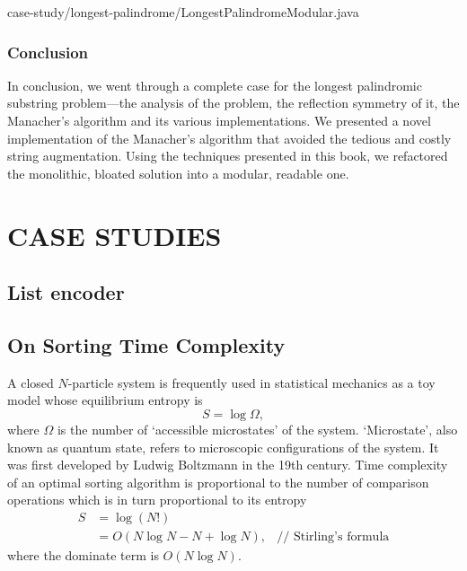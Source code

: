 \documentclass[oneside,11pt]{book}
\theoremstyle{definition}
\theoremstyle{remark}
\begin{document}

{case-study/longest-palindrome/LongestPalindromeModular.java}


\section{Conclusion}\label{sec:conclusion}

In conclusion, we went through a complete case for the longest palindromic substring
problem---the analysis of the problem, the reflection symmetry of it, the Manacher's algorithm
and its various implementations.
We presented a novel implementation of the Manacher's algorithm that avoided the tedious and costly
string augmentation.
Using the techniques presented in this book, we refactored the monolithic, bloated solution
into a modular, readable one.
\clearpage{}

    \part{\uppercase{Case Studies}}\label{prt:caseStudies}

    \clearpage{}

\chapter{List encoder}

\begin{clisting}
    
\end{clisting}

\clearpage{}

    \appendix
    \clearpage{}

\chapter{On Sorting Time Complexity}\label{ch:timeComplexityOfSorting}

A closed $N$-particle system is frequently used in statistical mechanics as a toy model
whose equilibrium entropy is \[S = \log \Omega,\] where $\Omega$ is the
number of `accessible microstates' of the system\cite{kittel1980thermal}.
`Microstate', also known as quantum state, refers to microscopic configurations of the system.
It was first developed by Ludwig Boltzmann in the 19th century.
Time complexity of an optimal sorting algorithm is proportional to the number of comparison
operations which is in turn proportional to its entropy
\begin{align*}
    S &= \log\left( N! \right) & \\
    &= O(N\log N-N + \log N), & \text{// Stirling's formula}
\end{align*}
where the dominate term is $O(N\log N)$.
\clearpage{}
    \clearpage{}
\end{document}
